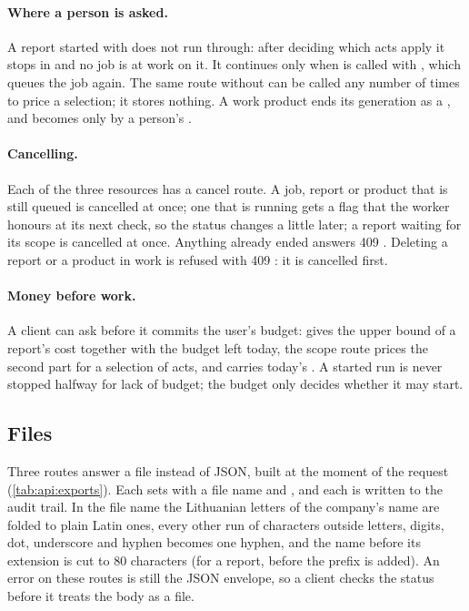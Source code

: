 \paragraph{Where a person is asked.} A report started with  does not run
through: after deciding which acts apply it stops in  and no job is at work
on it. It continues only when  is called with
, which queues the job again. The same route without  can
be called any number of times to price a selection; it stores nothing. A work product ends its
generation as a , and becomes  only by a person's
.

\paragraph{Cancelling.} Each of the three resources has a cancel route. A job, report or
product that is still queued is cancelled at once; one that is running gets a flag that the
worker honours at its next check, so the status changes a little later; a report waiting for
its scope is cancelled at once. Anything already ended answers 409 .
Deleting a report or a product in work is refused with 409 : it is
cancelled first.

\paragraph{Money before work.} A client can ask before it commits the user's budget:
 gives the upper bound of a report's cost together with the
budget left today, the scope route prices the second part for a selection of acts, and
 carries today's . A started run is never stopped halfway
for lack of budget; the budget only decides whether it may start.

\subsection{Files}\label{sec:api:files}

Three routes answer a file instead of JSON, built at the moment of the request
(\cref{tab:api:exports}). Each sets  with a file name and
, and each is written to the audit trail. In the file name the
Lithuanian letters of the company's name are folded to plain Latin ones, every other
run of characters outside letters, digits, dot, underscore and hyphen becomes one hyphen, and
the name before its extension is cut to 80 characters (for a report, before the prefix
 is added). An error on these routes is still the JSON envelope, so a client
checks the status before it treats the body as a file.

